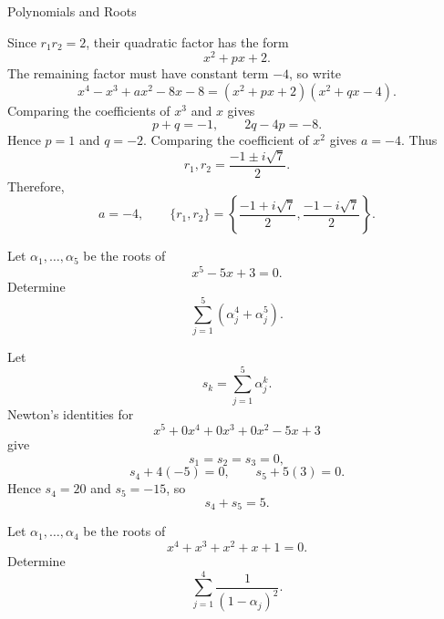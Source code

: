 \begin{expectedproblemgroup}{Polynomials and Roots}
        \begin{expectedsubsolution}
            Since $r_1r_2=2$, their quadratic factor has the form
            \[
                x^2+px+2.
            \]
            The remaining factor must have constant term $-4$, so write
            \[
                x^4-x^3+ax^2-8x-8
                =
                (x^2+px+2)(x^2+qx-4).
            \]
            Comparing the coefficients of $x^3$ and $x$ gives
            \[
                p+q=-1,
                \qquad
                2q-4p=-8.
            \]
            Hence $p=1$ and $q=-2$. Comparing the coefficient of $x^2$ gives
            $a=-4$. Thus
            \[
                r_1,r_2
                =
                \frac{-1\pm i\sqrt7}{2}.
            \]
            Therefore,
            \[
                \boxed{
                    a=-4,
                    \qquad
                    \{r_1,r_2\}
                    =
                    \left\{
                        \frac{-1+i\sqrt7}{2},
                        \frac{-1-i\sqrt7}{2}
                    \right\}
                }.
            \]
        \end{expectedsubsolution}

        \begin{expectedsubproblem}
            Let $\alpha_1,\ldots,\alpha_5$ be the roots of
            \[
                x^5-5x+3=0.
            \]
            Determine
            \[
                \sum_{j=1}^{5}
                \left(\alpha_j^4+\alpha_j^5\right).
            \]
        \end{expectedsubproblem}

        \begin{expectedsubsolution}
            Let
            \[
                s_k=\sum_{j=1}^{5}\alpha_j^k.
            \]
            Newton's identities for
            \[
                x^5+0x^4+0x^3+0x^2-5x+3
            \]
            give
            \[
                s_1=s_2=s_3=0,
            \]
            \[
                s_4+4(-5)=0,
                \qquad
                s_5+5(3)=0.
            \]
            Hence $s_4=20$ and $s_5=-15$, so
            \[
                \boxed{s_4+s_5=5}.
            \]
        \end{expectedsubsolution}

        \begin{expectedsubproblem}
            Let $\alpha_1,\ldots,\alpha_4$ be the roots of
            \[
                x^4+x^3+x^2+x+1=0.
            \]
            Determine
            \[
                \sum_{j=1}^{4}\frac{1}{(1-\alpha_j)^2}.
            \]
        \end{expectedsubproblem}


\end{expectedproblemgroup}
